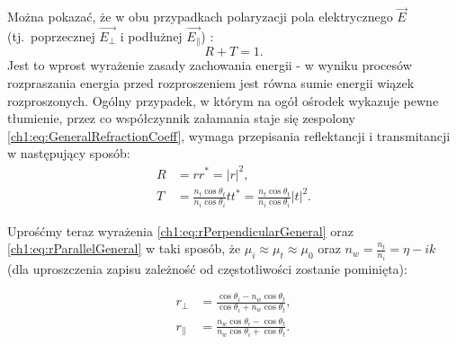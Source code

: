 Można pokazać, że w obu przypadkach polaryzacji pola elektrycznego $\vec{E}$ (tj.~poprzecznej $\vec{E_\perp}$ i podłużnej $\vec{E_\parallel}$) :
\begin{equation}
R + T = 1.
\end{equation}
Jest to wprost wyrażenie zasady zachowania energii - w wyniku procesów rozpraszania energia przed rozproszeniem jest równa sumie energii wiązek rozproszonych.
Ogólny przypadek, w którym na ogół ośrodek wykazuje pewne tłumienie, przez co współczynnik załamania staje się zespolony \eqref{ch1:eq:GeneralRefractionCoeff}, wymaga przepisania reflektancji i transmitancji w następujący sposób:
\begin{align}
\label{ch1:eq:ReflectanceGeneral}
R &= rr^* = |r|^2,\\
\label{ch1:eq:TransmitanceGeneral}
T &= \frac{n_t\cos\theta_t}{n_i\cos\theta_i}tt^* = \frac{n_t\cos\theta_t}{n_i\cos\theta_i}|t|^2.
\end{align}

Uprośćmy teraz wyrażenia \eqref{ch1:eq:rPerpendicularGeneral} oraz \eqref{ch1:eq:rParallelGeneral} w taki sposób, że $\mu_i \approx \mu_t \approx \mu_0$ oraz $n_w = \frac{n_t}{n_i}=\eta - ik$ (dla uproszczenia zapisu zależność od częstotliwości zostanie pominięta):

\begin{align}
\label{ch1:eq:SimpleFresnelRperp}
r_\perp &= \frac{\cos\theta_i - n_w\cos\theta_t}{\cos\theta_i + n_w\cos\theta_t},\\
\label{ch1:eq:SimpleFresnelRpara}
r_\parallel &= \frac{n_w\cos\theta_i - \cos\theta_t}{n_w\cos\theta_i + \cos\theta_t}.
\end{align}


